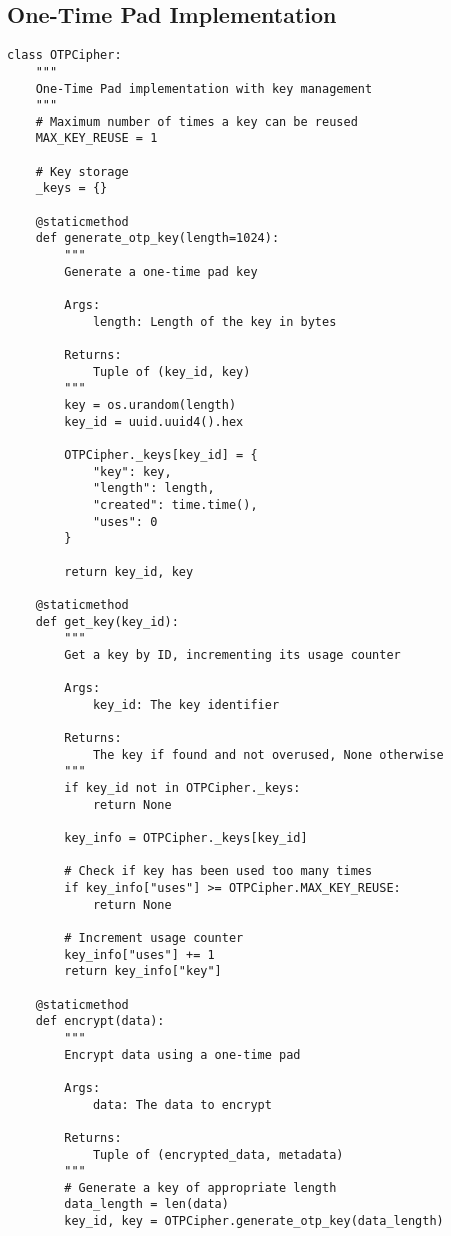\documentclass[12pt,a4paper]{report}
\begin{document}
\subsection{One-Time Pad Implementation}
\begin{lstlisting}[style=python, caption=One-Time Pad Implementation]
class OTPCipher:
    """
    One-Time Pad implementation with key management
    """
    # Maximum number of times a key can be reused
    MAX_KEY_REUSE = 1
    
    # Key storage
    _keys = {}
    
    @staticmethod
    def generate_otp_key(length=1024):
        """
        Generate a one-time pad key
        
        Args:
            length: Length of the key in bytes
            
        Returns:
            Tuple of (key_id, key)
        """
        key = os.urandom(length)
        key_id = uuid.uuid4().hex
        
        OTPCipher._keys[key_id] = {
            "key": key,
            "length": length,
            "created": time.time(),
            "uses": 0
        }
        
        return key_id, key
    
    @staticmethod
    def get_key(key_id):
        """
        Get a key by ID, incrementing its usage counter
        
        Args:
            key_id: The key identifier
            
        Returns:
            The key if found and not overused, None otherwise
        """
        if key_id not in OTPCipher._keys:
            return None
            
        key_info = OTPCipher._keys[key_id]
        
        # Check if key has been used too many times
        if key_info["uses"] >= OTPCipher.MAX_KEY_REUSE:
            return None
            
        # Increment usage counter
        key_info["uses"] += 1
        return key_info["key"]
    
    @staticmethod
    def encrypt(data):
        """
        Encrypt data using a one-time pad
        
        Args:
            data: The data to encrypt
            
        Returns:
            Tuple of (encrypted_data, metadata)
        """
        # Generate a key of appropriate length
        data_length = len(data)
        key_id, key = OTPCipher.generate_otp_key(data_length)
        

\end{lstlisting}
\end{document}
